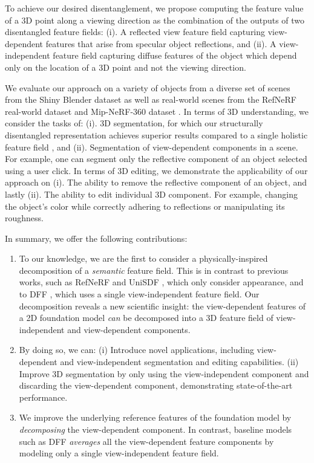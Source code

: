 To achieve our desired disentanglement, we propose computing the feature value of a 3D point along a viewing direction as the combination of the outputs of two disentangled feature fields: (i). A reflected view feature field capturing view-dependent features that arise from specular object reflections, and (ii). A view-independent feature field capturing diffuse features of the object which depend only on the location of a 3D point and not the viewing direction.


We evaluate our approach on a variety of objects from a diverse set of scenes from the Shiny Blender dataset \cite{verbin2022refnerf} as well as real-world scenes from the RefNeRF real-world dataset \cite{verbin2022refnerf} and Mip-NeRF-360 dataset \cite{barron2022mipnerf360}.
In terms of 3D understanding, we consider the tasks of: (i). 3D segmentation, for which our structurally disentangled representation achieves superior results compared to a single holistic feature field \cite{kobayashi2022decomposing},
and (ii). Segmentation of view-dependent components in a scene. For example, one can segment only the reflective component of an object selected using a user click.  In terms of 3D editing, we demonstrate the applicability of our approach on (i). The ability to remove the reflective component of an object, and lastly (ii). The ability to edit individual 3D component. For example, changing the object's color while correctly adhering to reflections or manipulating its roughness. 



In summary, we offer the following contributions:
\begin{enumerate}[nolistsep]
\item To our knowledge, we are the first to consider a physically-inspired decomposition of a \textit{semantic} feature field. This is in contrast to previous works, such as RefNeRF \cite{verbin2022refnerf} and UniSDF \cite{wang2023unisdf}, which only consider appearance, and to DFF \cite{kobayashi2022decomposing}, which uses a single view-independent feature field. Our decomposition reveals a new scientific insight: the view-dependent features of a 2D foundation model \textit{can} be decomposed into a 3D feature field of view-independent and view-dependent components.
\item By doing so, we can: (i) Introduce novel applications, including view-dependent and view-independent segmentation and editing capabilities. (ii) Improve 3D segmentation by only using the view-independent component and discarding the view-dependent component, demonstrating state-of-the-art performance.
\item We improve the underlying reference features of the foundation model by \textit{decomposing} the view-dependent component. In contrast, baseline models such as DFF \textit{averages} all the view-dependent feature components by modeling only a single view-independent feature field.
\end{enumerate}




